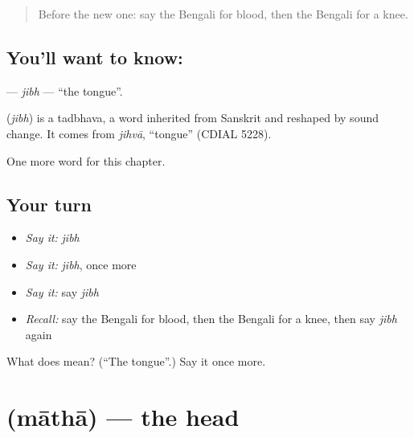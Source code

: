 \label{lesson:BN-C43-jibh}



\begin{quote}
Before the new one: say the Bengali for blood, then the Bengali for a knee.
\end{quote}

\subsection*{You'll want to know: }
\textbf{} — \emph{jibh} — \textquotedblleft{}the tongue\textquotedblright{}.

\begin{cousinweb}
\textbf{} (\emph{jibh}) is a tadbhava, a word inherited from Sanskrit and reshaped by sound change. It comes from \emph{jihvā}, \textquotedblleft{}tongue\textquotedblright{} (CDIAL 5228).
\end{cousinweb}

\begin{grammarlens}[title={What you've built}]
One more word for this chapter.
\end{grammarlens}

\subsection*{Your turn}
\begin{itemize}
\raggedright
  \item \emph{Say it:} \emph{jibh}
  \item \emph{Say it:} \emph{jibh}, once more
  \item \emph{Say it:} say \emph{jibh}
  \item \emph{Recall:} say the Bengali for blood, then the Bengali for a knee, then say \emph{jibh} again
\end{itemize}

\begin{tcolorbox}[breakable,colback=teal!4,colframe=teal!35!black,title={Before you move on}]
What does  mean? (\textquotedblleft{}The tongue\textquotedblright{}.) Say it once more.
\end{tcolorbox}
\section[\texorpdfstring{\bn{মাথা} (māthā)}{মাথা (māthā)}]{ (māthā) — the head}

\label{lesson:BN-C43-matha}



